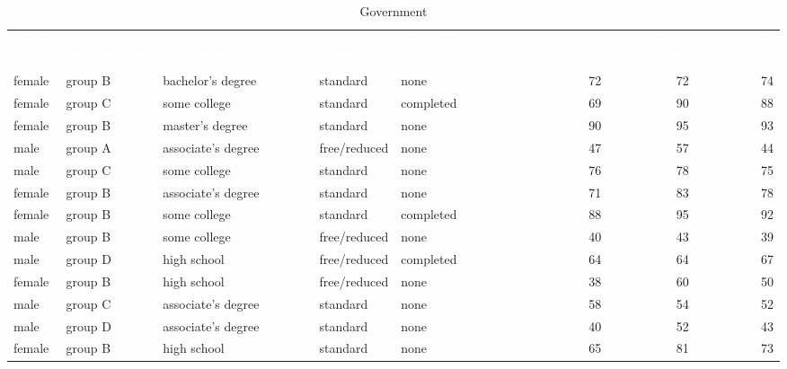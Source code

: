 \documentclass{article}
\begin{document}
	\raggedright
	\begin{sidewaystable}[t!]
		\caption{Government}
		\label{tab 1}
		\begin{tabular}{|l|l|l|l|l|r|r|r|}
			\rowcolor{blue!60}\textcolor{white}{Gender} & \textcolor{white}{Race/Ethnicity} & \textcolor{white}{Parental Level of Education} & \textcolor{white}{Lunch} & \textcolor{white}{Test Preparation Course} & \textcolor{white}{Math Score} & \textcolor{white}{Reading Score} & \textcolor{white}{Writing Score}\\
			female & group B & bachelor's degree & standard & none & 72 & 72 & 74\\
			\hline
			female & group C & some college & standard & completed & 69 & 90 & 88\\
			\hline
			female & group B & master's degree & standard & none & 90 & 95 & 93\\
			\hline
			male & group A & associate's degree & free/reduced & none & 47 & 57 & 44\\
			\hline
			male & group C & some college & standard & none & 76 & 78 & 75\\ \hline
			female & group B & associate's degree & standard & none & 71 & 83 & 78\\ \hline
			female & group B & some college & standard & completed & 88 & 95 & 92\\ \hline
			male & group B & some college &  free/reduced & none & 40 & 43 & 39\\ \hline
			male & group D & high school & free/reduced & completed & 64 & 64 &67 \\ \hline
			female & group B & high school & free/reduced & none & 38 & 60 & 50\\ \hline
			male & group C & associate's degree & standard & none & 58 & 54 & 52\\ \hline
			male & group D & associate's degree & standard & none & 40 & 52 & 43\\ \hline
			female & group B & high school & standard & none & 65 & 81 & 73 \\ \hline
		\end{tabular}
	\end{sidewaystable}


	
\end{document}
